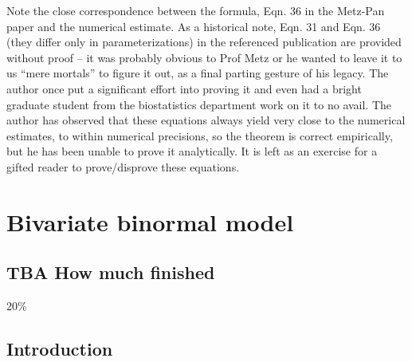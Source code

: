 \documentclass[
]{book}
\begin{document}
Note the close correspondence between the formula, Eqn. 36 in the Metz-Pan paper and the numerical estimate. As a historical note, Eqn. 31 and Eqn. 36 (they differ only in parameterizations) in the referenced publication are provided without proof -- it was probably obvious to Prof Metz or he wanted to leave it to us ``mere mortals'' to figure it out, as a final parting gesture of his legacy. The author once put a significant effort into proving it and even had a bright graduate student from the biostatistics department work on it to no avail. The author has observed that these equations always yield very close to the numerical estimates, to within numerical precisions, so the theorem is correct empirically, but he has been unable to prove it analytically. It is left as an exercise for a gifted reader to prove/disprove these equations.

\hypertarget{bivariate-binormal-model}{%
\chapter{Bivariate binormal model}\label{bivariate-binormal-model}}

\hypertarget{bivariate-binormal-model-how-much-finished}{%
\section{TBA How much finished}\label{bivariate-binormal-model-how-much-finished}}

20\%

\hypertarget{bivariate-binormal-model-introduction}{%
\section{Introduction}\label{bivariate-binormal-model-introduction}}
\end{document}
